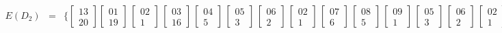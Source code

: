 \[\begin{array}{rcl}
E(D_2) &=& \{ \begin{bmatrix} 13 \\ 20 \end{bmatrix} \begin{bmatrix} 01 \\ 19 \end{bmatrix}\,\begin{bmatrix} 02 \\ 1 \end{bmatrix}\,\begin{bmatrix} 03 \\ 16 \end{bmatrix}\,\begin{bmatrix} 04 \\ 5 \end{bmatrix}\,\begin{bmatrix} 05 \\ 3 \end{bmatrix}\,\begin{bmatrix} 06 \\ 2 \end{bmatrix}\,\begin{bmatrix} 02 \\ 1 \end{bmatrix}\,\begin{bmatrix} 07 \\ 6 \end{bmatrix}\,\begin{bmatrix} 08 \\ 5 \end{bmatrix}\,\begin{bmatrix} 09 \\ 1 \end{bmatrix}\,\begin{bmatrix} 05 \\ 3 \end{bmatrix}\,\begin{bmatrix} 06 \\ 2 \end{bmatrix}\,\begin{bmatrix} 02 \\ 1 \end{bmatrix}\,\begin{bmatrix} 10 \\ 3 \end{bmatrix}\,\begin{bmatrix} 11 \\ 2 \end{bmatrix}\,\begin{bmatrix} 12 \\ 1 \end{bmatrix}\,\begin{bmatrix} 09 \\ 1 \end{bmatrix} \} \\[1em]

\end{array}\]
